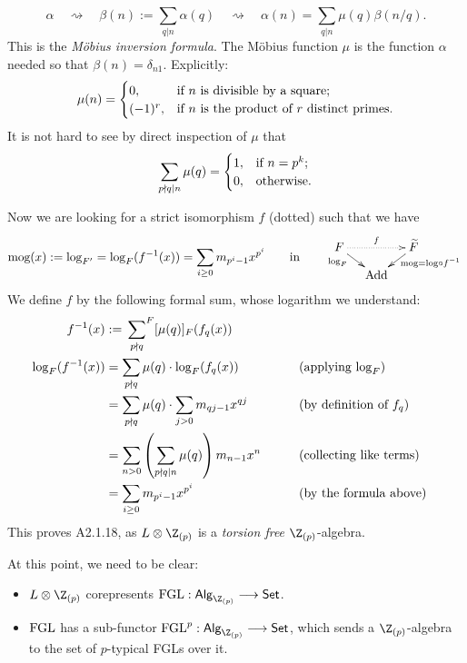 \documentclass[11pt]{article}
\newcommand\Fsum{\sideset{}{^F}\sum}
\newcommand{\FGL}{\textup{FGL}}
\newcommand{\FGLp}{\textup{FGL}^{p}}
\newcommand{\ZpAlg}{\textsf{Alg}_{\Z_{(p)}}}
\begin{document}
\begin{Formal Group Laws}
\begin{itemise}
\begin{shaded}
\[\alpha\quad \rightsquigarrow \quad \beta(n):=\sum_{q|n}\alpha(q)\quad \rightsquigarrow\quad  \alpha(n)=\sum_{q|n}\mu(q)\beta(n/q).\]
This is the \emph{M\"obius inversion formula}. The M\"obius function $\mu$ is the function $\alpha$ needed so that $\beta(n)=\delta_{n1}$. Explicitly:
\[\mu(n)=\begin{cases}
0,&\textup{if $n$ is divisible by a square};\\
(-1)^r,&\textup{if $n$ is the product of $r$ distinct primes.}
\end{cases}
\]
It is not hard to see by direct inspection of $\mu$ that 
\[\sum_{p\nmid q\mid n}\mu(q)=\begin{cases}
1,&\textup{if }n=p^k;\\
0,&\textup{otherwise}.
\end{cases}
\]
\end{shaded}
Now we are looking for a strict isomorphism $f$ (dotted) such that we have
\[\textup{mog}(x):=\log_{F'}=\log_{F}(f^{-1}(x))=\sum_{i\geq0}m_{p^i-1}x^{p^{i}}\textup{\qquad in\qquad }
\vcenter{\xymatrix@R=.3cm@C=.4cm{
\ar[rd]_-(.0){\textup{log}_F}F\ar@{..>}[rr]^-{f}&%
&%
\widetilde{F}\ar[ld]^-(.0){\textup{mog}=\textup{log}\circ f^{-1}}\\%
&%
\textup{Add}&%
}}\]
We define $f$ by the following {formal} sum, whose logarithm we understand:
\begin{alignat*}{2}
f^{-1}(x)
&:=
\Fsum_{p\nmid q}[\mu(q)]_F(f_q(x))%
\\
\log_F(f^{-1}(x))
&=
\sum_{p\nmid q}\mu(q)\cdot\log_F(f_q(x))%
&\qquad&\text{(applying $\log_F$)}\\
&=
\sum_{p\nmid q}\mu(q)\cdot\sum_{j>0}m_{qj-1}x^{qj}%
&\qquad&\text{(by definition of $f_q$)}\\
&=
\sum_{n>0}\left(\sum_{p\nmid q\mid n}\mu(q)\right)m_{n-1}x^{n}%
&\qquad&\text{(collecting like terms)}\\
&=
\sum_{i\geq0}m_{p^i-1}x^{p^{i}}%
&\qquad&\text{(by the formula above)}
\end{alignat*}
This proves A2.1.18, as $L\otimes\Z_{(p)}$ is a \emph{torsion free} $\Z_{(p)}$-algebra.
\item 
At this point, we need to be clear:
\begin{itemize}\squishlist
\item $L\otimes\Z_{(p)}$ corepresents $\FGL:\ZpAlg\to\Set$.
\item $\FGL$ has a sub-functor $\FGLp:\ZpAlg\to\Set$, which sends a $\Z_{(p)}$-algebra to the set of $p$-typical FGLs over it.

\end{itemize}
\end{itemise}
\end{Formal Group Laws}
\end{document}
